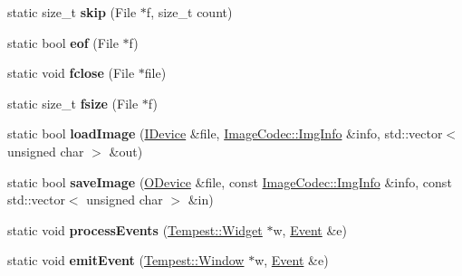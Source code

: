 \begin{DoxyCompactItemize}
\item 
\hypertarget{class_tempest_1_1_system_a_p_i_a785b504e9f6610da44fa5cbc04c32054}{static size\+\_\+t {\bfseries skip} (File $\ast$f, size\+\_\+t count)}\label{class_tempest_1_1_system_a_p_i_a785b504e9f6610da44fa5cbc04c32054}

\item 
\hypertarget{class_tempest_1_1_system_a_p_i_afa41bd1b1d32bf49a3f6934ebcb2347a}{static bool {\bfseries eof} (File $\ast$f)}\label{class_tempest_1_1_system_a_p_i_afa41bd1b1d32bf49a3f6934ebcb2347a}

\item 
\hypertarget{class_tempest_1_1_system_a_p_i_a7e65461caca28d0888238eeed2f85aa1}{static void {\bfseries fclose} (File $\ast$file)}\label{class_tempest_1_1_system_a_p_i_a7e65461caca28d0888238eeed2f85aa1}

\item 
\hypertarget{class_tempest_1_1_system_a_p_i_ad14ea2bb2b276d6664ac3853ad1f4e81}{static size\+\_\+t {\bfseries fsize} (File $\ast$f)}\label{class_tempest_1_1_system_a_p_i_ad14ea2bb2b276d6664ac3853ad1f4e81}

\item 
\hypertarget{class_tempest_1_1_system_a_p_i_aa21d6246043f9c001cc03d843a8892eb}{static bool {\bfseries load\+Image} (\hyperlink{class_tempest_1_1_i_device}{I\+Device} \&file, \hyperlink{struct_tempest_1_1_pixmap_1_1_img_info}{Image\+Codec\+::\+Img\+Info} \&info, std\+::vector$<$ unsigned char $>$ \&out)}\label{class_tempest_1_1_system_a_p_i_aa21d6246043f9c001cc03d843a8892eb}

\item 
\hypertarget{class_tempest_1_1_system_a_p_i_a9541d75467697ca108f2b92b4397d828}{static bool {\bfseries save\+Image} (\hyperlink{class_tempest_1_1_o_device}{O\+Device} \&file, const \hyperlink{struct_tempest_1_1_pixmap_1_1_img_info}{Image\+Codec\+::\+Img\+Info} \&info, const std\+::vector$<$ unsigned char $>$ \&in)}\label{class_tempest_1_1_system_a_p_i_a9541d75467697ca108f2b92b4397d828}

\item 
\hypertarget{class_tempest_1_1_system_a_p_i_a1050f586fcc84895594b7b651efe2a7a}{static void {\bfseries process\+Events} (\hyperlink{class_tempest_1_1_widget}{Tempest\+::\+Widget} $\ast$w, \hyperlink{class_tempest_1_1_event}{Event} \&e)}\label{class_tempest_1_1_system_a_p_i_a1050f586fcc84895594b7b651efe2a7a}

\item 
\hypertarget{class_tempest_1_1_system_a_p_i_ae2459e976a9f3712b1998aeee1c2423f}{static void {\bfseries emit\+Event} (\hyperlink{class_tempest_1_1_window}{Tempest\+::\+Window} $\ast$w, \hyperlink{class_tempest_1_1_event}{Event} \&e)}\label{class_tempest_1_1_system_a_p_i_ae2459e976a9f3712b1998aeee1c2423f}


\end{DoxyCompactItemize}
